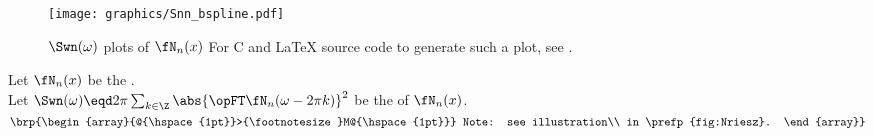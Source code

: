 \begin{figure}
  \centering%
  \texttt{[image: graphics/Snn\_bspline.pdf]}
  \caption{
     $\Swn(\omega)$ plots of  $\fN_n(x)$ 
    For C and {\LaTeX} source code to generate such a plot, see .
    \label{fig:Nriesz}
    }
\end{figure}
\begin{lemma}
\label{lem:Nriesz}
Let $\fN_n(x)$ be the  .\\
Let $\Swn(\omega)\eqd 2\pi\sum_{k\in\Z}\abs{\opFT\fN_n(\omega-2\pi k)}^2$ 
be the   of $\fN_n(x)$.
\hfill
$\brp{\begin{array}{@{\hspace{1pt}}>{\footnotesize}M@{\hspace{1pt}}}
  Note: see illustration\\
  in \prefp{fig:Nriesz}.
\end{array}}$
\end{lemma}

